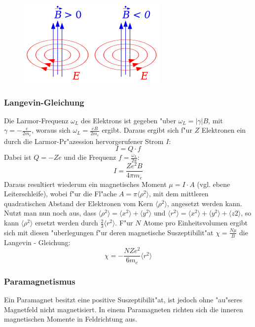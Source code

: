             \begin{figure}[H]
                \centering
                \includegraphics{Images/lenzRegel.png}
                \label{figLenz}
            \end{figure}
        \subsubsection*{Langevin-Gleichung}
        Die Larmor-Frequenz $\omega_L$ des Elektrons ist gegeben "uber $\omega_L = |\gamma | B$, mit $\gamma = -\frac{e}{2m_e}$, woraus sich $\omega_L = \frac{eB}{2m_e}$ ergibt. Daraus ergibt sich f"ur $Z$ Elektronen ein durch die Larmor-Pr"azession hervorgerufener Strom $I$:
        \begin{equation}
        	I = Q \cdot f
        \end{equation}
        Dabei ist $Q = -Ze$ und die Frequenz $f = \frac{\omega_L}{2\pi}$:
        \begin{equation}
        	I = \frac{Ze^2 B}{4\pi m_e}
        \end{equation}
Daraus resultiert wiederum ein magnetisches Moment $\mu = I \cdot A$ (vgl. ebene Leiterschleife), wobei f"ur die Fl"ache $A = \pi \langle \rho^2 \rangle$, mit dem mittleren quadratischen Abstand der Elektronen vom Kern $\langle \rho^2 \rangle$, angesetzt werden kann.\\
Nutzt man nun noch aus, dass $\langle \rho^2 \rangle = \langle x^2 \rangle + \langle y^2 \rangle$ und $\langle r^2 \rangle = \langle x^2 \rangle + \langle y^2 \rangle + \langle z2 \rangle$, so kann $\langle \rho^2 \rangle$ ersetzt werden durch $\frac{2}{3} \langle r^2 \rangle$. F"ur $N$ Atome pro Einheitsvolumen ergibt sich mit diesen "uberlegungen f"ur deren magnetische Suszeptibilit"at $\chi = \frac{N\mu}{B}$ die Langevin - Gleichung:
	\begin{equation}
		\chi = - \frac{NZe^2}{6m_e} \langle r^2 \rangle
	\end{equation}
        \subsubsection*{Paramagnetismus}
            Ein Paramagnet besitzt eine positive Suszeptibilit"at, ist jedoch ohne "au"seres
            Magnetfeld nicht magnetisiert. In einem Paramagneten richten sich die inneren magnetischen Momente
            in Feldrichtung aus.
